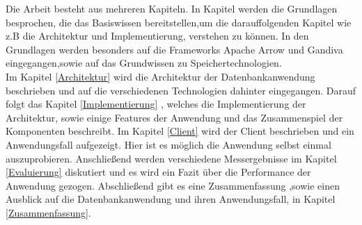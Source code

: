 Die Arbeit besteht aus mehreren Kapiteln. In Kapitel \label{Grundlagen} werden die Grundlagen besprochen, die das Basiswissen bereitstellen,um die darauffolgenden Kapitel wie z.B die Architektur und Implementierung, verstehen zu können.
In den Grundlagen werden besonders auf die Frameworks Apache Arrow und Gandiva eingegangen,sowie auf das Grundwissen zu Speichertechnologien.\\
Im Kapitel \ref{Architektur} wird die Architektur der Datenbankanwendung  beschrieben und auf die verschiedenen Technologien dahinter eingegangen. Darauf folgt das Kapitel \ref{Implementierung} , welches die Implementierung der Architektur, sowie einige Features der Anwendung und das Zusammenspiel der Komponenten beschreibt. 
Im Kapitel \ref{Client} wird der Client beschrieben und ein Anwendungsfall aufgezeigt. Hier ist es möglich die Anwendung selbst einmal auszuprobieren.
Anschließend werden verschiedene Messergebnisse im Kapitel \ref{Evaluierung} diskutiert und es wird ein Fazit über die Performance der Anwendung gezogen.
Abschließend gibt es eine Zusammenfassung ,sowie einen Ausblick auf die Datenbankanwendung und ihren Anwendungsfall, in Kapitel \ref{Zusammenfassung}. 
  
